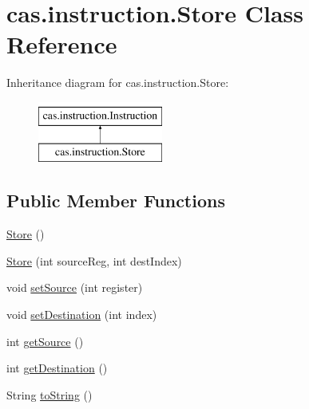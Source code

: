 \hypertarget{classcas_1_1instruction_1_1_store}{\section{cas.\-instruction.\-Store Class Reference}
\label{classcas_1_1instruction_1_1_store}
}
Inheritance diagram for cas.\-instruction.\-Store\-:\begin{figure}[H]
\begin{center}
\leavevmode
\includegraphics[height=2.000000cm]{classcas_1_1instruction_1_1_store}
\end{center}
\end{figure}
\subsection*{Public Member Functions}
\begin{DoxyCompactItemize}
\item 
\hyperlink{classcas_1_1instruction_1_1_store_a52d5abb93080a665767b0945268aeb86}{Store} ()
\item 
\hyperlink{classcas_1_1instruction_1_1_store_aa770b8c5fa1464fe2ff1f20d107038e9}{Store} (int source\-Reg, int dest\-Index)
\item 
void \hyperlink{classcas_1_1instruction_1_1_store_a6c73b7ba1d07b6af353996f2c6adb5f9}{set\-Source} (int register)
\item 
void \hyperlink{classcas_1_1instruction_1_1_store_a22b10014664b917917f05e28dec71c68}{set\-Destination} (int index)
\item 
int \hyperlink{classcas_1_1instruction_1_1_store_a0c3006d03d5a7108eaedd3d57f52424d}{get\-Source} ()
\item 
int \hyperlink{classcas_1_1instruction_1_1_store_a1373fd9c0dd7bb7ebb0f94e33587ad4a}{get\-Destination} ()
\item 
String \hyperlink{classcas_1_1instruction_1_1_store_a2b6c52613d1654df84d65e1dc1d90455}{to\-String} ()
\end{DoxyCompactItemize}


